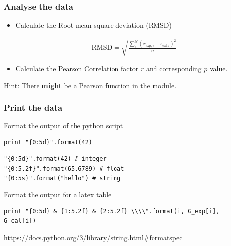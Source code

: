 \begin{frame}[fragile]

    \frametitle{Analyse the data}

    \begin{itemize}
        \item Calculate the Root-mean-square deviation (RMSD)

        \begin{align*}
            \mathrm{RMSD} = \sqrt{\frac{\sum_i^N (x_{\mathrm{exp},i}-x_{\mathrm{cal},i})^2 }{n}}
        \end{align*}

    \end{itemize}

    \begin{itemize}
        \item Calculate the Pearson Correlation factor $r$ and corresponding $p$ value.
    \end{itemize}

    \bigskip

    Hint: There {\bf might} be a Pearson function in the  module.

\end{frame}


\begin{frame}[fragile]

    \frametitle{Print the data}

    Format the output of the python script

\begin{lstlisting}
print "{0:5d}".format(42)
\end{lstlisting}

\smallskip

\begin{lstlisting}
"{0:5d}".format(42) # integer
"{0:5.2f}".format(65.6789) # float
"{0:5s}".format("hello") # string
\end{lstlisting}

\bigskip

Format the output for a latex table

\smallskip

\begin{lstlisting}
print "{0:5d} & {1:5.2f} & {2:5.2f} \\\\".format(i, G_exp[i], G_cal[i])
\end{lstlisting}

\bigskip

https://docs.python.org/3/library/string.html\#formatspec

\end{frame}


